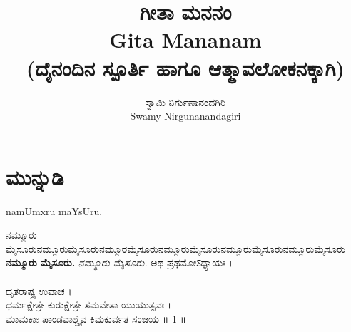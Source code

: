 \documentclass[12pt,twoside,openright,a5paper]{book}
\title{\Huge \kanfont ಗೀತಾ ಮನನಂ\\Gita Mananam\\\small(ದೈನಂದಿನ ಸ್ಪೂರ್ತಿ ಹಾಗೂ ಆತ್ಮಾವಲೋಕನಕ್ಕಾಗಿ)}
\author{\large \kanfont ಸ್ವಾಮಿ ನಿರ್ಗುಣಾನಂದಗಿರಿ\\Swamy Nirgunanandagiri}
\begin{document}
\maketitle
\thispagestyle{empty}
\tableofcontents
\pagestyle{fancy}
\chapter{\kanfont ಮುನ್ನುಡಿ}

\textenglish{namUmxru maYsUru.}

ನಮ್ಮೂರು ಮೈಸೂರುನಮ್ಮೂರುಮೈಸೂರುನಮ್ಮೂರಮೈಸೂರುನಮ್ಮೂರುಮೈಸೂರುನಮ್ಮೂರುಮೈಸೂರುನಮ್ಮೂರುಮೈಸೂರು
\textbf{ನಮ್ಮೂರು ಮೈಸೂರು.}
\emph{ನಮ್ಮೂರು ಮೈಸೂರು.}
ಅಥ ಪ್ರಥಮೋऽಧ್ಯಾಯಃ ।\\
\\
ಧೃತರಾಷ್ಟ್ರ ಉವಾಚ ।\\
ಧರ್ಮಕ್ಷೇತ್ರೇ ಕುರುಕ್ಷೇತ್ರೇ ಸಮವೇತಾ ಯುಯುತ್ಸವಃ ।\\
ಮಾಮಕಾಃ ಪಾಂಡವಾಶ್ಚೈವ ಕಿಮಕುರ್ವತ ಸಂಜಯ ॥ 1 ॥\\
\end{document}

